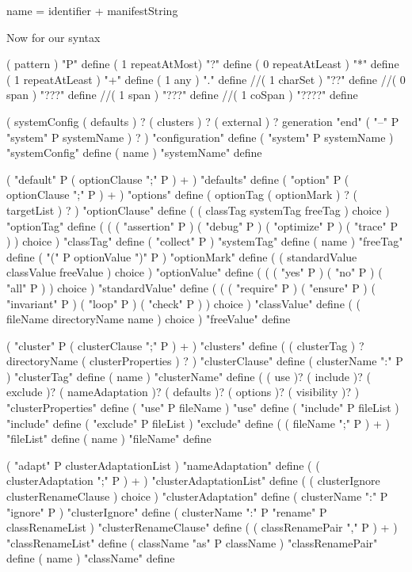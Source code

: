 name = identifier + manifestString
\stoptyping

Now for our syntax

\startJoylol
( pattern ) "P" define
( 1 repeatAtMost) "?" define
( 0 repeatAtLeast ) "*" define
( 1 repeatAtLeast ) "+" define
( 1 any ) "." define
//( 1 charSet ) "??" define
//( 0 span ) "???" define
//( 1 span ) "???" define
//( 1 coSpan ) "????" define
\stopJoylol

\startJoylol
(
  systemConfig
  ( defaults ) ?
  ( clusters ) ?
  ( external ) ?
  generation
  "end" ( "--" P "system" P systemName ) ?
) "configuration" define
( "system" P systemName ) "systemConfig" define
( name ) "systemName" define

( "default" P ( optionClause ";" P ) + ) "defaults" define
( "option"  P ( optionClause ";" P ) + ) "options" define
( 
  optionTag 
  ( optionMark ) ? 
  ( targetList ) ?
) "optionClause" define
( ( classTag systemTag freeTag ) choice ) "optionTag" define
(
  ( 
    ( "assertion" P )
    ( "debug" P )
    ( "optimize" P )
    ( "trace" P )
  ) choice
) "classTag" define
( "collect" P ) "systemTag" define
( name ) "freeTag" define
( "(" P optionValue ")" P ) "optionMark" define
( ( standardValue classValue freeValue ) choice ) "optionValue" define
(
  ( 
    ( "yes" P )
    ( "no" P )
    ( "all" P )
  ) choice
) "standardValue" define
(
  ( 
    ( "require" P )
    ( "ensure" P )
    ( "invariant" P )
    ( "loop" P )
    ( "check" P )
  ) choice
) "classValue" define
( ( fileName directoryName name ) choice ) "freeValue" define

( "cluster" P ( clusterClause ";" P ) + ) "clusters" define
( 
  ( clusterTag ) ?
  directoryName 
  ( clusterProperties ) ?
) "clusterClause" define
( clusterName ":" P ) "clusterTag" define
( name ) "clusterName" define
(
  ( use )?
  ( include )?
  ( exclude )?
  ( nameAdaptation )?
  ( defaults )?
  ( options )?
  ( visibility )?
) "clusterProperties" define
( "use" P fileName ) "use" define
( "include" P fileList ) "include" define
( "exclude" P fileList ) "exclude" define
( ( fileName ";" P ) + ) "fileList" define
( name ) "fileName" define

( "adapt" P clusterAdaptationList ) "nameAdaptation" define
( ( clusterAdaptation ";" P ) + ) "clusterAdaptationList" define
( ( clusterIgnore clusterRenameClause ) choice ) "clusterAdaptation" define
( clusterName ":" P "ignore" P ) "clusterIgnore" define
( clusterName ":" P "rename" P classRenameList ) "clusterRenameClause" define
( ( classRenamePair "," P ) + ) "classRenameList" define
( className "as" P className ) "classRenamePair" define
( name ) "className" define

